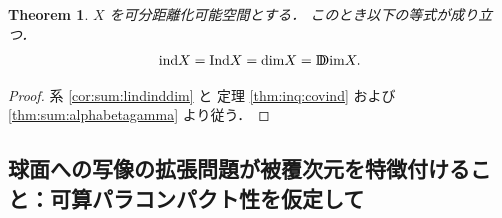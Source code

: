 \documentclass[leqno, a4paper, 12pt]{jsarticle}
\theoremstyle{plain}
\newtheorem{thm}{Theorem}[section]
\theoremstyle{definition}
\theoremstyle{remark}
\newcommand{\yoind}{\mathrm{ind}}
\newcommand{\yolind}{\mathrm{Ind}}
\newcommand{\yoddim}{\mathrm{D\hspace{-5.5pt}Dim}}
\newcommand{\yodim}{\mathrm{dim}}
\numberwithin{equation}{section}
\begin{document}
\begin{thm}\label{thm:sum:coincides}
$X$
を可分距離化可能空間とする．
このとき以下の等式が成り立つ．
\begin{align}
\yoind X =\yolind X =\yodim X =\yoddim X. 
\end{align}
\end{thm}
\begin{proof}
系
\ref{cor:sum:lindinddim}
と
定理
\ref{thm:inq:covind}
および
\ref{thm:sum:alphabetagamma}
より従う．
\end{proof}

\subsection{球面への写像の拡張問題が被覆次元を特徴付けること：可算パラコンパクト性を仮定して}\label{subsec:boursuk}
\end{document}
